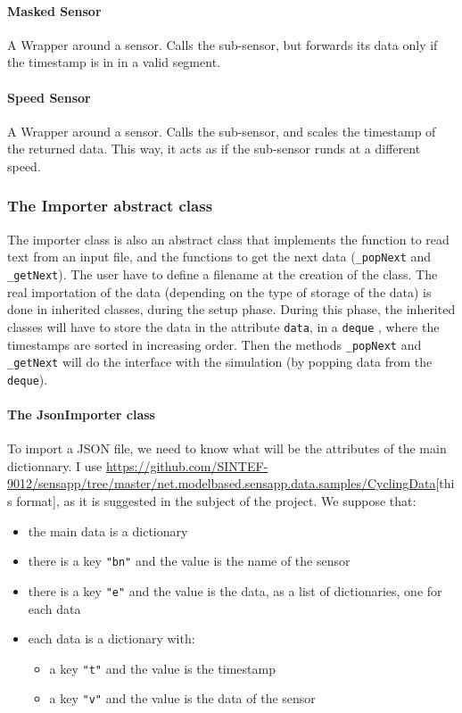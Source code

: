 \paragraph{Masked Sensor}

A Wrapper around a sensor. Calls the sub-sensor, but forwards its data only if
the timestamp is in in a valid segment.

\paragraph{Speed Sensor}

A Wrapper around a sensor. Calls the sub-sensor, and scales the timestamp of
the returned data. This way, it acts as if the sub-sensor runds at a different
speed.


\subsubsection{The Importer abstract class}

The importer class is also an abstract class that implements the function to read text from an input file, and the functions to get the next data (\verb!_popNext! and \verb!_getNext!). The user have to define a filename at the creation of the class. The real importation of the data (depending on the type of storage of the data) is done in inherited classes, during the setup phase. During this phase, the inherited classes will have to store the data in the attribute \verb!data!, in a \verb!deque! , where the timestamps are sorted in increasing order. Then the methods \verb!_popNext! and \verb!_getNext! will do the interface with the simulation (by popping data from the \verb!deque!).

\paragraph{The JsonImporter class}

To import a JSON file, we need to know what will be the attributes of the main dictionnary. I use \url{https://github.com/SINTEF-9012/sensapp/tree/master/net.modelbased.sensapp.data.samples/CyclingData}[this format], as it is suggested in the subject of the project. We suppose that:
\begin{itemize}
\item the main data is a dictionary
\item there is a key \verb!"bn"! and the value is the name of the sensor
\item there is a key \verb!"e"! and the value is the data, as a list of dictionaries, one for each data
\item each data is a dictionary with:
      \begin{itemize}
      \item a key \verb!"t"! and the value is the timestamp
      \item a key \verb!"v"! and the value is the data of the sensor
      \end{itemize}
\end{itemize}

